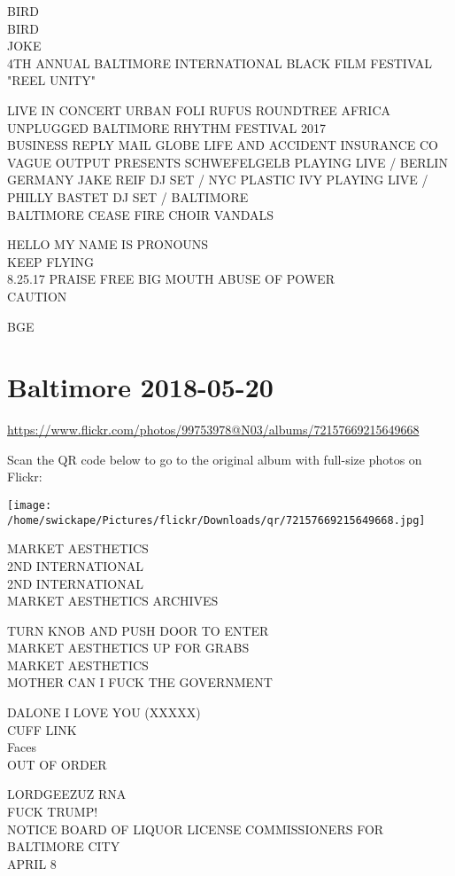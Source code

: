 \documentclass[10pt,letterpaper]{article}
\begin{document}
BIRD\\
BIRD\\
JOKE\\
4TH ANNUAL BALTIMORE INTERNATIONAL BLACK FILM FESTIVAL "REEL UNITY"

LIVE IN CONCERT URBAN FOLI RUFUS ROUNDTREE AFRICA UNPLUGGED BALTIMORE RHYTHM FESTIVAL 2017\\
BUSINESS REPLY MAIL GLOBE LIFE AND ACCIDENT INSURANCE CO\\
VAGUE OUTPUT PRESENTS SCHWEFELGELB  PLAYING LIVE / BERLIN GERMANY JAKE REIF DJ SET / NYC PLASTIC IVY PLAYING LIVE / PHILLY BASTET DJ SET / BALTIMORE\\
BALTIMORE CEASE FIRE CHOIR VANDALS

HELLO MY NAME IS PRONOUNS\\
KEEP FLYING\\
8.25.17 PRAISE FREE BIG MOUTH ABUSE OF POWER\\
CAUTION

BGE


\section*{Baltimore 2018-05-20}

\url{https://www.flickr.com/photos/99753978@N03/albums/72157669215649668}

Scan the QR code below to go to the original album with full-size photos on Flickr:

\texttt{[image: /home/swickape/Pictures/flickr/Downloads/qr/72157669215649668.jpg]}


MARKET AESTHETICS\\
2ND INTERNATIONAL\\
2ND INTERNATIONAL\\
MARKET AESTHETICS ARCHIVES

TURN KNOB AND PUSH DOOR TO ENTER\\
MARKET AESTHETICS UP FOR GRABS\\
MARKET AESTHETICS\\
MOTHER CAN I FUCK THE GOVERNMENT

DALONE I LOVE YOU (XXXXX)\\
CUFF LINK\\
Faces\\
OUT OF ORDER

LORDGEEZUZ RNA\\
FUCK TRUMP!\\
NOTICE BOARD OF LIQUOR LICENSE COMMISSIONERS FOR BALTIMORE CITY\\
APRIL 8
\end{document}
